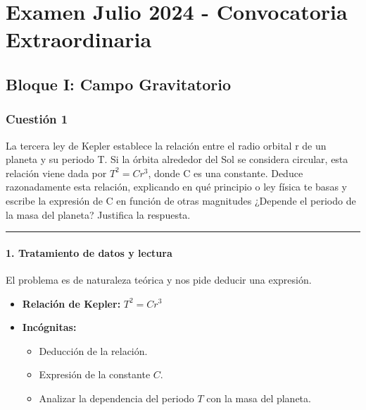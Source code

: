 \chapter{Examen Julio 2024 - Convocatoria Extraordinaria}
\label{chap:2024_jul_ext}

\section{Bloque I: Campo Gravitatorio}
\label{sec:grav_2024_jul_ext}

\subsection{Cuestión 1}
\label{subsec:C1_2024_jul_ext}

\begin{cajaenunciado}
La tercera ley de Kepler establece la relación entre el radio orbital r de un planeta y su periodo T. Si la órbita alrededor del Sol se considera circular, esta relación viene dada por $T^{2}=C r^{3}$, donde C es una constante. Deduce razonadamente esta relación, explicando en qué principio o ley física te basas y escribe la expresión de C en función de otras magnitudes ¿Depende el periodo de la masa del planeta? Justifica la respuesta.
\end{cajaenunciado}
\hrule

\subsubsection*{1. Tratamiento de datos y lectura}
El problema es de naturaleza teórica y nos pide deducir una expresión.
\begin{itemize}
    \item \textbf{Relación de Kepler:} $T^2 = C r^3$
    \item \textbf{Incógnitas:}
    \begin{itemize}
        \item Deducción de la relación.
        \item Expresión de la constante $C$.
        \item Analizar la dependencia del periodo $T$ con la masa del planeta.
    \end{itemize}
\end{itemize}

\newpage

